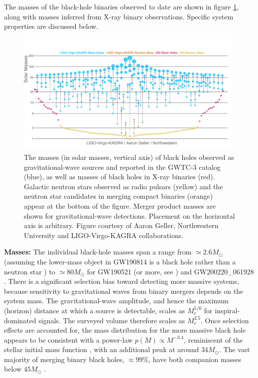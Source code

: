 \documentclass[review]{elsarticle}
\begin{document}
The masses of the black-hole binaries observed to date are shown in figure \ref{fig:BHmasses}, along with masses inferred from X-ray binary observations. Specific system properties are discussed below.

\begin{figure}
	\centering
	\includegraphics[width=0.99\textwidth]{Graveyard.png}
	\caption{The masses (in solar masses, vertical axis) of black holes observed as gravitational-wave sources and reported in the GWTC-3 catalog (blue), as well as masses of black holes in X-ray binaries (red).  Galactic neutron stars observed as radio pulsars (yellow) and the neutron star candidates in merging compact binaries (orange) appear at the bottom of the figure.  Merger product masses are shown for gravitational-wave detections. Placement on the horizontal axis is arbitrary.  Figure courtesy of Aaron Geller, Northwestern University and LIGO-Virgo-KAGRA collaborations.}\label{fig:BHmasses} 
\end{figure}

\textbf{Masses:} The individual black-hole masses span a range from $\simeq 2.6 M_\odot$ (assuming the lower-mass object in GW190814 is a black hole rather than a neutron star \citep{GW190814}) to $\simeq 80 M_\odot$ for GW190521 \citep{GW190521} (or more, see \cite{FishbachHolz:2020,NitzCapano:2021}) and GW200220\_061928 \citep{GWTC3}.  There is a significant selection bias  toward detecting more massive systems, because sensitivity to gravitational waves from binary mergers depends on the system mass.  The gravitational-wave amplitude, and hence the maximum (horizon) distance at which a source is detectable, scales as $M_c^{5/6}$ for inspiral-dominated signals. The surveyed volume therefore scales as $M_c^{2.5}$.  Once selection effects are accounted for, the mass distribution for the more massive black hole appears to be consistent with a power-law $p(M) \propto M^{-3.4}$, reminiscent of the stellar initial mass function \citep{Salpeter:1955}, with an additional peak at around $34 M_\odot$.  The vast majority of merging binary black holes, $\approx 99\%$, have both companion masses below $45 M_\odot$ \citep{GWTC3:pop}.   
\end{document}

